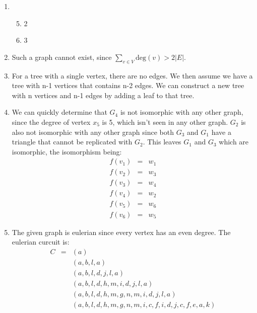 \documentclass[12pt]{article}
\newcommand{\s}[1]{\setcounter{enumi}{#1}}
\begin{document}
\begin{enumerate}

  \item
    \begin{enumerate}
      \setcounter{enumii}{4}

       \item 2

       \item 3

    \end{enumerate}

  \s{2}

  \item Such a graph cannot exist, since $\sum_{v \in V} \mathrm{deg}(v) > 2 |E|$.

  \s{5}

  \item For a tree with a single vertex, there are no edges. We then assume we have a tree with n-1 vertices that contains n-2 edges. We can construct a new tree with n vertices and n-1 edges by adding a leaf to that tree.

  \item We can quickly determine that $G_4$ is not isomorphic with any other graph, since the degree of vertex $x_5$ is 5, which isn't seen in any other graph. $G_2$ is also not isomorphic with any other graph since both $G_3$ and $G_1$ have a triangle that cannot be replicated with $G_2$. This leaves $G_1$ and $G_3$ which are isomorphic, the isomorphism being:
    \begin{eqnarray*}
      f\left(v_1\right) &=& w_1 \\ 
      f\left(v_2\right) &=& w_3 \\
      f\left(v_3\right) &=& w_4 \\
      f\left(v_4\right) &=& w_2 \\
      f\left(v_5\right) &=& w_6 \\
      f\left(v_6\right) &=& w_5
    \end{eqnarray*}

  \s{8}

  \item The given graph is eulerian since every vertex has an even degree. The eulerian curcuit is:
    \begin{eqnarray*}
      C &=& \left(a\right) \\
        & & \left(a, b, l, a\right) \\
        & & \left(a, b, l, d, j, l, a\right) \\
        & & \left(a, b, l, d, h, m, i, d, j, l, a\right) \\
        & & \left(a, b, l, d, h, m, g, n, m, i, d, j, l, a\right) \\
        & & \left(a, b, l, d, h, m, g, n, m, i, c, f, i, d, j, c, f, e, a, k\right)
    \end{eqnarray*}


\end{enumerate}
\end{document}
